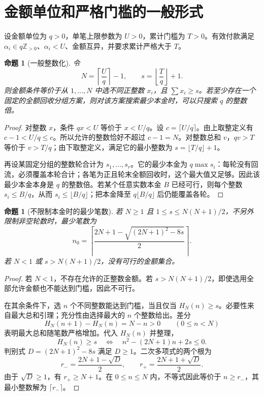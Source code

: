 \documentclass[UTF8,a4paper]{ctexbook}
\newtheorem{proposition}[theorem]{命题}
\theoremstyle{definition}
\numberwithin{equation}{chapter}
\newcommand{\Z}{\mathbb{Z}}
\newcommand{\1}{\mathbf{1}}
\begin{document}
\section{金额单位和严格门槛的一般形式}
设金额单位为 $q>0$，单笔上限参数为 $U>0$，累计门槛为 $T>0$。有效付款满足 $\alpha_i\in q\Z_{>0}$、$\alpha_i<U$、金额互异，并要求累计严格大于 $T$。

\begin{proposition}[一般整数化]\label{gen:rounding}
令
\begin{equation}\label{gen:Ns}
N=\left\lceil\frac Uq\right\rceil-1,
\qquad
s=\left\lfloor\frac Tq\right\rfloor+1.
\end{equation}
则金额条件等价于从 $1,\ldots,N$ 中选不同正整数 $x_i$，且 $\sum x_i\ge s$。若至少存在一个固定的全额回收分组方案，则对该方案搜索最少本金时，可以只搜索 $q$ 的整数倍。
\end{proposition}
\begin{proof}
对整数 $x$，条件 $qx<U$ 等价于 $x<U/q$。设 $c=\lceil U/q\rceil$。由上取整定义有 $c-1<U/q\le c$。所以允许的整数恰好不超过 $c-1=N$。对整数总和 $v$，$qv>T$ 等价于 $v>T/q$；由下取整定义，满足它的最小整数为 $s=\lfloor T/q\rfloor+1$。

再设某固定分组的整数轮合计为 $s_1,\ldots,s_r$。它的最少本金为 $q\max s_i$：每轮没有回流，必须覆盖本轮合计；各笔为正且轮末全额回收时，这个最大值又足够。因此该最少本金本身是 $q$ 的整数倍。若某个任意实数本金 $B$ 已经可行，则每个整数 $s_i\le B/q$，从而 $s_i\le\lfloor B/q\rfloor$；把本金降至 $q\lfloor B/q\rfloor$ 后仍能覆盖各轮。
\end{proof}

\begin{proposition}[不限制本金时的最少笔数]\label{gen:nmin}
若 $N\ge1$ 且 $1\le s\le N(N+1)/2$，不另外限制非空轮数时，最少笔数为
\begin{equation}\label{gen:nroot}
n_0=\left\lceil
\frac{2N+1-\sqrt{(2N+1)^2-8s}}2
\right\rceil.
\end{equation}
若 $N<1$ 或 $s>N(N+1)/2$，没有可行的金额集合。
\end{proposition}
\begin{proof}
若 $N<1$，不存在允许的正整数金额。若 $s>N(N+1)/2$，即使选用全部允许金额也不能达到门槛，因此不可行。

在其余条件下，选 $n$ 个不同整数能达到门槛，当且仅当 $H_N(n)\ge s$。必要性来自最大总和引理；充分性由选择最大的 $n$ 个整数给出。差分
\[
H_N(n+1)-H_N(n)=N-n>0\qquad(0\le n<N)
\]
表明最大总和随笔数严格增加。代入 $H_N(n)$ 并整理，
\[
H_N(n)\ge s
\quad\Longleftrightarrow\quad
n^2-(2N+1)n+2s\le0.
\]
判别式 $D=(2N+1)^2-8s$ 满足 $D\ge1$。二次多项式的两个根为
\[
r_- =\frac{2N+1-\sqrt D}{2},
\qquad
r_+ =\frac{2N+1+\sqrt D}{2}.
\]
由于 $\sqrt D\ge1$，有 $r_+\ge N+1$。在 $0\le n\le N$ 内，不等式因此等价于 $n\ge r_-$，其最小整数解为 $\lceil r_-\rceil$。
\end{proof}
\end{document}
